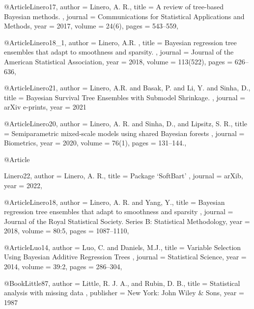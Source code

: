 @Article{Linero17,
   author =   {Linero, A. R.},
   title =    {  A review of tree-based Bayesian methods.  },
   journal =      {Communications for Statistical Applications and Methods},
   year =     {2017},
   volume =   {24(6)},
   pages =    {543--559},
 }

 


@Article{Linero18_1,
   author =   {Linero, A.R. },
   title =    { Bayesian regression tree ensembles that adapt to smoothness and sparsity.  },
   journal =      {Journal of the American Statistical Association},
   year =     {2018},
   volume =   {113(522)},
   pages =    {626--636},
 }

 

@Article{Linero21,
   author =   { Linero, A.R. and Basak, P. and Li, Y. and Sinha, D.},
   title =    { Bayesian Survival Tree Ensembles with Submodel Shrinkage.  },
   journal =      {arXiv e-prints},
   year =     {2021}
 }

 

@Article{Linero20,
   author =   {Linero, A. R. and Sinha, D., and Lipsitz, S. R.},
   title =    { Semiparametric mixed‐scale models using shared Bayesian forests  },
   journal =      {Biometrics},
   year =     {2020},
   volume =   {76(1)},
   pages =    {131--144.},
 }

 @Article{Linero22,
   author =   {Linero, A. R.},
   title =    { Package ‘SoftBart’  },
   journal =      {arXib},
   year =     {2022},
   
 }

 

@Article{Linero18,
   author =   {Linero, A. R. and Yang, Y.},
   title =    { Bayesian regression tree ensembles that adapt to smoothness and sparsity  },
   journal =      {Journal of the Royal Statistical Society. Series B: Statistical Methodology},
   year =     {2018},
   volume =   {80:5},
   pages =    {1087--1110},
 }


@Article{Luo14,
   author =   {Luo, C. and Daniels, M.J.},
   title =    { Variable Selection Using Bayesian Additive Regression Trees },
   journal =      {Statistical Science},
   year =     {2014},
   volume =   {39:2},
   pages =    {286--304},
 }





@Book{Little87,
   author =   {Little, R. J. A., and Rubin, D. B.},
   title =    { Statistical analysis with missing data   },
   publisher =      {New York: John Wiley \& Sons},
   year =     {1987}
 }

